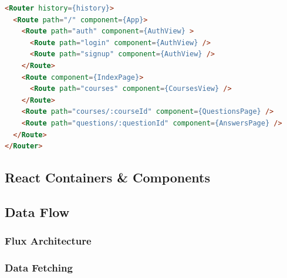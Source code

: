 \begin{lstlisting}[language=HTML, caption=Router in client app , label={list:router-client-imp}]
<Router history={history}>
  <Route path="/" component={App}>
    <Route path="auth" component={AuthView} >
      <Route path="login" component={AuthView} />
      <Route path="signup" component={AuthView} />
    </Route>
    <Route component={IndexPage}>
      <Route path="courses" component={CoursesView} />
    </Route>
    <Route path="courses/:courseId" component={QuestionsPage} />
    <Route path="questions/:questionId" component={AnswersPage} />
  </Route>
</Router>
\end{lstlisting}





\subsection{React Containers \& Components}


\subsection{Data Flow}

\subsubsection{Flux Architecture}

\subsubsection{Data Fetching}
